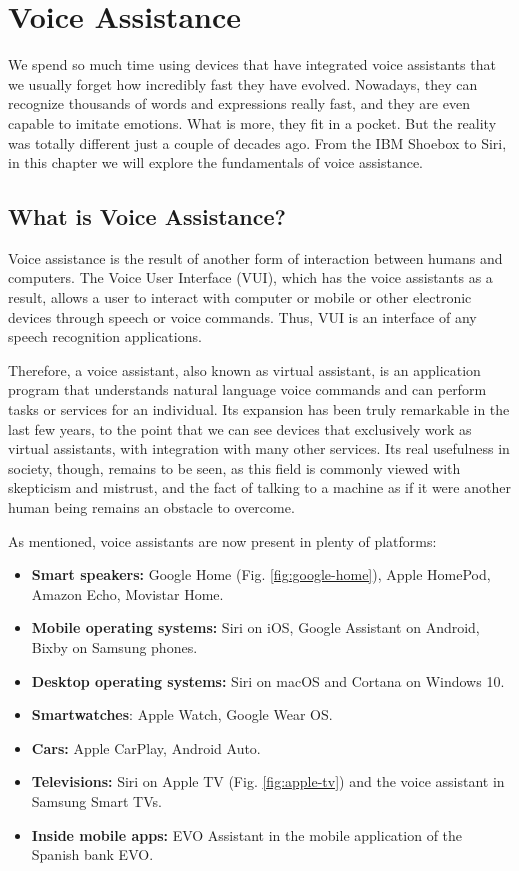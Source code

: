 \chapter{Voice Assistance}

We spend so much time using devices that have integrated voice assistants that we usually forget how incredibly fast they have
evolved. Nowadays, they can recognize thousands of words and expressions really fast, and they are even capable to imitate
emotions. What is more, they fit in a pocket. But the reality was totally different just a couple of decades ago. From the IBM
Shoebox to Siri, in this chapter we will explore the fundamentals of voice assistance.

\section{What is Voice Assistance?}
Voice assistance is the result of another form of interaction between humans and computers.\cite{botsocietyVUI} The Voice User
Interface (VUI), which has the voice assistants as a result, allows a user to interact with computer or mobile or other electronic
devices through speech or voice commands. Thus, VUI is an interface of any speech recognition applications.

Therefore, a voice assistant, also known as virtual assistant, is an application program that understands natural language voice
commands and can perform tasks or services for an individual. Its expansion has been truly remarkable in the last few years, to the
point that we can see devices that exclusively work as virtual assistants, with integration with many other services. Its real usefulness
in society, though, remains to be seen, as this field is commonly viewed with skepticism and mistrust, and the fact of talking to a
machine as if it were another human being remains an obstacle to overcome.

As mentioned, voice assistants are now present in plenty of platforms:
\begin{itemize}
	\item \textbf{Smart speakers:} Google Home (Fig. \ref{fig:google-home}), Apple HomePod, Amazon Echo, Movistar Home.
	\item \textbf{Mobile operating systems:} Siri on iOS, Google Assistant on Android, Bixby on Samsung phones.
	\item \textbf{Desktop operating systems:} Siri on macOS and Cortana on Windows 10.
	\item \textbf{Smartwatches}: Apple Watch, Google Wear OS.
	\item \textbf{Cars:} Apple CarPlay, Android Auto.
	\item \textbf{Televisions:} Siri on Apple TV (Fig. \ref{fig:apple-tv}) and the voice assistant in Samsung Smart TVs.
	\item \textbf{Inside mobile apps:} EVO Assistant in the mobile application of the Spanish bank EVO.
\end{itemize}

